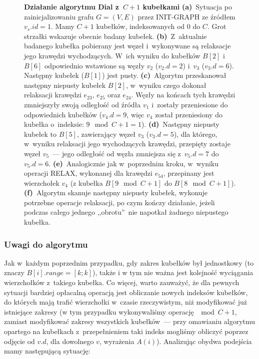 \begin{figure}[!htbp]
\begin{subfigure}[b]{\textwidth}
\begin{subfigure}[b]{0.3\textwidth}
			\caption{}
			\label{fig:exampleDial:f}
		\end{subfigure}
		\hfill\null
	\end{subfigure}
	\caption{
		\textbf{Działanie algorytmu Dial z~$C+1$ kubełkami}
		\textbf{(a)}~Sytuacja po zainicjalizowaniu grafu $G = \left( V, E \right)$ przez \textsf{INIT-GRAPH} ze źródłem $v_{s}.id = 1$.
		Mamy $C+1$ kubełków, indeksowanych od $0$ do $C$.
		Grot strzałki wskazuje obecnie badany kubełek.
		\textbf{(b)}~Z~aktualnie badanego kubełka pobierany jest węzeł i~wykonywane są relaksacje jego krawędzi wychodzących.
		W~ich wyniku do kubełków $B \left[ 2 \right]$ i~$B \left[ 6 \right]$ odpowiednio wstawione są węzły $v_{2}$ ($v_{2}.d = 2$) i~$v_{3}$ ($v_{3}.d = 6$).
		Następny kubełek ($B \left[ 1\right]$) jest pusty.
		\textbf{(c)}~Algorytm przeskanował następny niepusty kubełek $B \left[ 2 \right]$, w~wyniku czego dokonał relaksacji krawędzi $e_{23}$, $e_{25}$ oraz $e_{24}$.
		Węzły na końcach tych krawędzi zmniejszyły swoją odległość od źródła $v_{1}$ i~zostały przeniesione do odpowiednich kubełków ($v_{4}.d = 9$, więc $v_{4}$ został przeniesiony do kubełka o~indeksie: $9 \mod{C+1} = 1$).
		\textbf{(d)}~Następny niepusty kubełek to $B \left[ 5 \right]$, zawierający węzeł $v_{3}$ ($v_{3}.d = 5$), dla którego, w~wyniku relaksacji jego wychodzących krawędzi, przepięty zostaje węzeł $v_{5}$~--- jego odległość od węzła zmniejsza się z~$v_{5}.d = 7$ do $v_{5}.d = 6$.
		\textbf{(e)}~Analogicznie jak w~poprzednim kroku, w~wyniku operacji \textsc{RELAX}, wykonanej dla krawędzi $e_{54}$, przepinany jest wierzchołek $v_{4}$ (z kubełka $B \left[ 9 \mod{C+1} \right]$ do $B \left[ 8 \mod{C+1} \right]$).
		\textbf{(f)}~Algorytm skanuje następny niepusty kubełek, wykonuje potrzebne operacje relaksacji, po czym kończy działanie, jeżeli podczas całego jednego ,,obrotu''~nie napotkał żadnego niepustego kubełka.
	}
	\label{fig:exampleDial}
\end{figure}


\subsubsection{Uwagi do algorytmu}


Jak w~każdym poprzednim przypadku, gdy zakres kubełków był jednostkowy (to znaczy $B \left[ i \right].range = \left[ k ; k \right]$), także i w tym nie ważna jest kolejność wyciągania wierzchołków z~takiego kubełka.
Co więcej, warto zauważyć, że dla pewnych sytuacji bardziej opłacalną operacją jest obliczanie nowych indeksów kubełków, do których mają trafić wierzchołki w~czasie rzeczywistym, niż modyfikować już istniejące zakresy (w tym przypadku wykonywaliśmy operację $\mod{C+1}$, zamiast modyfikować zakresy wszystkich kubełków~--- przy omawianiu algorytmu opartego na kubełkach z~przepełnieniem taki indeks mogliśmy obliczyć poprzez odjęcie od $v.d$, dla dowolnego $v$, wyrażenia $A \left( i \right)$). Analizując obydwa podejścia mamy następującą sytuację:

